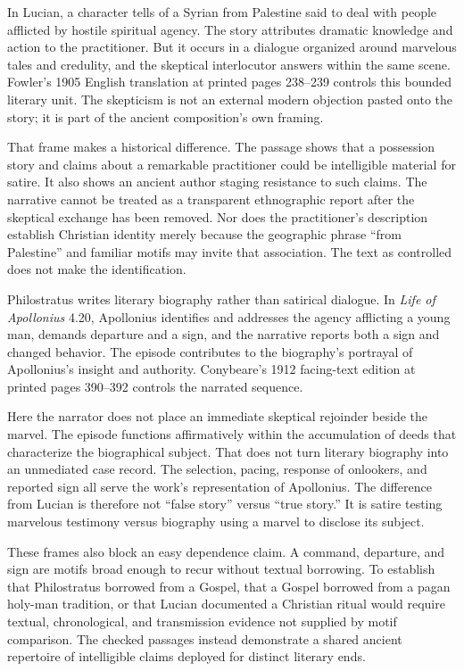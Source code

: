 In Lucian, a character tells of a Syrian from Palestine said to deal with
people afflicted by hostile spiritual agency. The story attributes dramatic
knowledge and action to the practitioner. But it occurs in a dialogue
organized around marvelous tales and credulity, and the skeptical interlocutor
answers within the same scene. Fowler's 1905 English translation at printed
pages 238--239 controls this bounded literary unit. The skepticism is not an
external modern objection pasted onto the story; it is part of the ancient
composition's own framing.

That frame makes a historical difference. The passage shows that a possession
story and claims about a remarkable practitioner could be intelligible
material for satire. It also shows an ancient author staging resistance to
such claims. The narrative cannot be treated as a transparent ethnographic
report after the skeptical exchange has been removed. Nor does the
practitioner's description establish Christian identity merely because the
geographic phrase ``from Palestine'' and familiar motifs may invite that
association. The text as controlled does not make the identification.

Philostratus writes literary biography rather than satirical dialogue. In
\emph{Life of Apollonius} 4.20, Apollonius identifies and addresses the
agency afflicting a young man, demands departure and a sign, and the narrative
reports both a sign and changed behavior. The episode contributes to the
biography's portrayal of Apollonius's insight and authority. Conybeare's 1912
facing-text edition at printed pages 390--392 controls the narrated sequence.

Here the narrator does not place an immediate skeptical rejoinder beside the
marvel. The episode functions affirmatively within the accumulation of deeds
that characterize the biographical subject. That does not turn literary
biography into an unmediated case record. The selection, pacing, response of
onlookers, and reported sign all serve the work's representation of
Apollonius. The difference from Lucian is therefore not ``false story'' versus
``true story.'' It is satire testing marvelous testimony versus biography
using a marvel to disclose its subject.

These frames also block an easy dependence claim. A command, departure, and
sign are motifs broad enough to recur without textual borrowing. To establish
that Philostratus borrowed from a Gospel, that a Gospel borrowed from a pagan
holy-man tradition, or that Lucian documented a Christian ritual would require
textual, chronological, and transmission evidence not supplied by motif
comparison. The checked passages instead demonstrate a shared ancient
repertoire of intelligible claims deployed for distinct literary ends.

